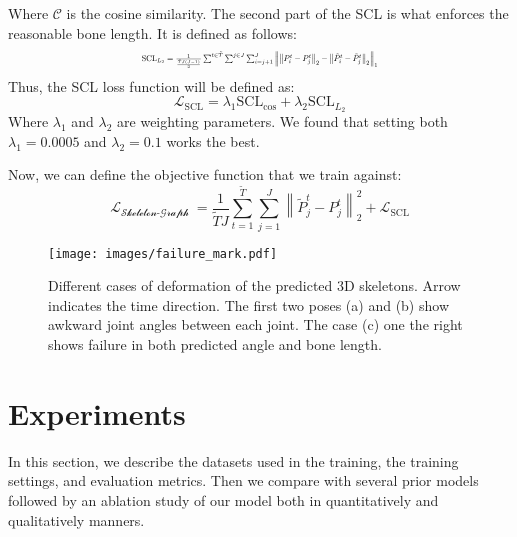 \documentclass[10pt,twocolumn,letterpaper]{article}
\newcommand*{\ours}{Skeleton-Graph }
\begin{document}
Where $\mathcal{C}$ is the cosine similarity. The second part of the SCL is what enforces the reasonable bone length. It is defined as follows: \\ 
\[
\resizebox{0.49\textwidth}{!}{$\text{SCL}_{L_2} =\frac{1}{\frac{\tilde{T}J(J-1)}{2}}\sum^{t \in\tilde{T}} \sum^{j\in J} \sum_{i = j+1 }^{J}  \left\| \left\|P^t_i-P^t_j\right\|_2 - \left\|\tilde{P}^t_i-\tilde{P}^t_j\right\|_2 \right\|_{1}$}
\]
Thus, the SCL loss function  will be defined as: 
\begin{equation}
    \mathcal{L}_{\text{SCL}} = \lambda_1 \text{SCL}_{\text{cos}} +  \lambda_2 \text{SCL}_{L_2}
\end{equation}
Where $\lambda_1$ and $\lambda_2$ are weighting parameters. We found that setting both $\lambda_1=0.0005$ and $\lambda_2=0.1$ works the best.
 
Now, we can define the objective function that we train against:
\begin{equation}
    \mathcal{L_\text{\ours}} = \frac{1}{\tilde{T}J} \sum_{t =1 }^{\tilde{T}} \sum_{j =1 }^J \left \| \tilde{P}^t_j-P^t_j \right \|_2^2 + \mathcal{L}_{\text{SCL}} 
\end{equation}
\begin{figure*}[t]
	\centering
\texttt{[image: images/failure\_mark.pdf]}
	\caption{Different cases of deformation of the predicted 3D skeletons. Arrow indicates the time direction. The first two poses (a) and (b) show awkward joint angles between each joint. The case (c) one the right shows failure in both predicted angle and bone length.}
	\label{gr:weirdskeletons}
\end{figure*}

\section{Experiments}
In this section, we describe the datasets used in the training, the training settings, and evaluation metrics. Then we compare with several prior models followed by an ablation study of our model both in quantitatively and qualitatively manners.
\end{document}
